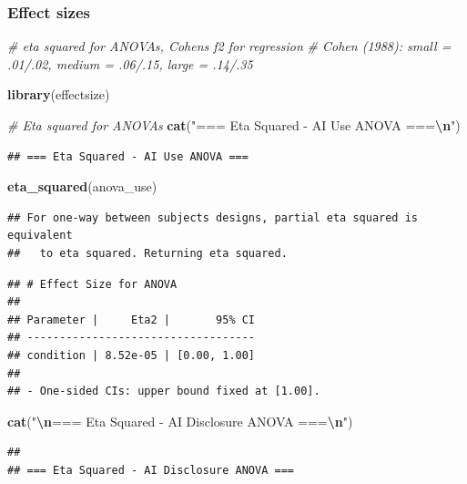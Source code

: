 \documentclass[
]{article}
\newenvironment{Shaded}{\begin{snugshade}}{\end{snugshade}}
\newcommand{\CommentTok}[1]{\textcolor[rgb]{0.56,0.35,0.01}{\textit{#1}}}
\newcommand{\FunctionTok}[1]{\textcolor[rgb]{0.13,0.29,0.53}{\textbf{#1}}}
\newcommand{\NormalTok}[1]{#1}
\newcommand{\SpecialCharTok}[1]{\textcolor[rgb]{0.81,0.36,0.00}{\textbf{#1}}}
\newcommand{\StringTok}[1]{\textcolor[rgb]{0.31,0.60,0.02}{#1}}
\begin{document}
\subsubsection{Effect sizes}\label{effect-sizes-1}

\begin{Shaded}
\begin{Highlighting}[]
\CommentTok{\# eta squared for ANOVAs, Cohen\textquotesingle{}s f2 for regression}
\CommentTok{\# Cohen (1988): small = .01/.02, medium = .06/.15, large = .14/.35}

\FunctionTok{library}\NormalTok{(effectsize)}

\CommentTok{\# Eta squared for ANOVAs}
\FunctionTok{cat}\NormalTok{(}\StringTok{"=== Eta Squared {-} AI Use ANOVA ===}\SpecialCharTok{\textbackslash{}n}\StringTok{"}\NormalTok{)}
\end{Highlighting}
\end{Shaded}

\begin{verbatim}
## === Eta Squared - AI Use ANOVA ===
\end{verbatim}

\begin{Shaded}
\begin{Highlighting}[]
\FunctionTok{eta\_squared}\NormalTok{(anova\_use)}
\end{Highlighting}
\end{Shaded}

\begin{verbatim}
## For one-way between subjects designs, partial eta squared is equivalent
##   to eta squared. Returning eta squared.
\end{verbatim}

\begin{verbatim}
## # Effect Size for ANOVA
## 
## Parameter |     Eta2 |       95% CI
## -----------------------------------
## condition | 8.52e-05 | [0.00, 1.00]
## 
## - One-sided CIs: upper bound fixed at [1.00].
\end{verbatim}

\begin{Shaded}
\begin{Highlighting}[]
\FunctionTok{cat}\NormalTok{(}\StringTok{"}\SpecialCharTok{\textbackslash{}n}\StringTok{=== Eta Squared {-} AI Disclosure ANOVA ===}\SpecialCharTok{\textbackslash{}n}\StringTok{"}\NormalTok{)}
\end{Highlighting}
\end{Shaded}

\begin{verbatim}
## 
## === Eta Squared - AI Disclosure ANOVA ===
\end{verbatim}
\end{document}
